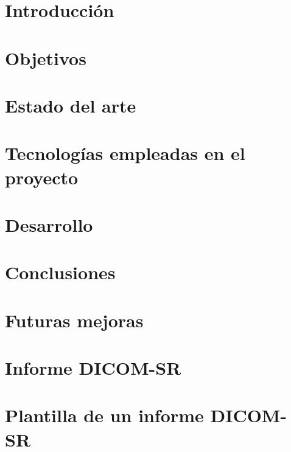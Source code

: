 \documentclass[12pt,a4paper,titlepage,twoside]{report}
\begin{document}
\chapter{Introducción}


\chapter{Objetivos}


\chapter{Estado del arte }\label{arte}


\chapter{Tecnologías empleadas en el proyecto}


\chapter{Desarrollo}


\chapter{Conclusiones}

\chapter{Futuras mejoras}




\appendix
\chapter{Informe DICOM-SR}\label{dicom-sr}


\chapter{Plantilla de un informe DICOM-SR}\label{dicom-sr-template}

\end{document}
